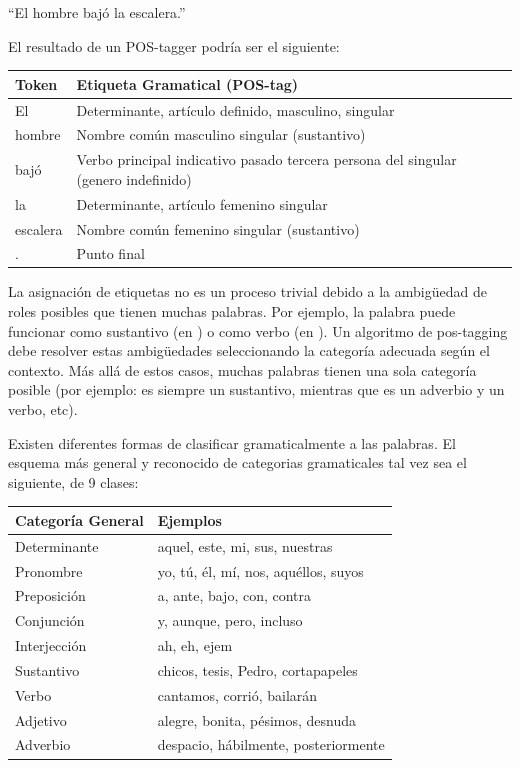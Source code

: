 \begin{center}
{\textquotedblleft}El hombre bajó la escalera.{\textquotedblright} 
\end{center}
\medskip

El resultado de un POS-tagger podría ser el siguiente:%

\begin{center}
\begin{tabular}{| l | l |}
 \hline
Token & Etiqueta Gramatical (POS-tag) \\ \hline
El  & Determinante, artículo definido, masculino, singular\\ \hline
hombre &  Nombre común masculino singular (sustantivo) \\ \hline
bajó  & Verbo principal indicativo pasado tercera persona del singular (genero indefinido)\\ \hline
la  & Determinante, artículo femenino singular \\ \hline
escalera & Nombre común femenino singular (sustantivo) \\ \hline
.  & Punto final\\ \hline
\end{tabular}
\end{center}

La asignación de etiquetas no es un proceso trivial debido a la ambigüedad de roles posibles que tienen muchas palabras. Por ejemplo, la palabra
 puede funcionar como sustantivo (en ) o como verbo (en ). 
Un algoritmo de pos-tagging debe resolver estas ambigüedades seleccionando la categoría adecuada según el contexto. Más allá de estos casos, muchas palabras tienen una sola categoría posible (por ejemplo:  es siempre un sustantivo, mientras que  es un adverbio y  un verbo, etc).

Existen diferentes formas de clasificar gramaticalmente a las palabras. El esquema más general y reconocido de categorias gramaticales tal vez sea el siguiente, de 9 clases:
\begin{center}
\begin{tabular}{| l | l |}
 \hline
Categoría General & Ejemplos \\ \hline 
Determinante & aquel, este, mi, sus, nuestras \\ \hline
Pronombre & yo, tú, él, mí, nos, aquéllos, suyos \\ \hline
Preposición & a, ante, bajo, con, contra\\ \hline
Conjunción & y, aunque, pero, incluso\\ \hline
Interjección & ah, eh, ejem\\ \hline
Sustantivo & chicos, tesis, Pedro, cortapapeles\\ \hline
Verbo & cantamos, corrió, bailarán\\ \hline
Adjetivo & alegre, bonita, pésimos, desnuda\\ \hline
Adverbio & despacio, hábilmente, posteriormente\\ \hline
\end{tabular}
\end{center}

